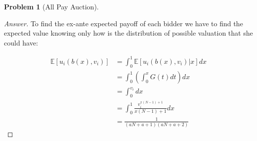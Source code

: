 \documentclass[12pt]{article}
\theoremstyle{definition}
\newtheorem{problem}{Problem}
\begin{document}
\begin{problem}[All Pay Auction]
\begin{proof}[Answer]
To find the ex-ante expected payoff of each bidder we have to find the expected value knowing only how is the distribution of possible valuation that she could have:

\begin{align*}
  \mathbb{E}[u_i(b(x),v_i)] &= \int_0^1\mathbb{E}[u_i(b(x),v_i)|x]dx\\&=\int_0^1\left(\int_0^{x}G(t)dt\right)dx \\&=\int_0^{v_i}dx \\&=\int_0^1 \frac{v_i^{x (N-1)+1}}{x (N-1)+1} dx\\ &= \frac{1}{(a N+a+1) (a N+a+2)}  
\end{align*}


\end{proof}
\end{problem} 
\end{document}
